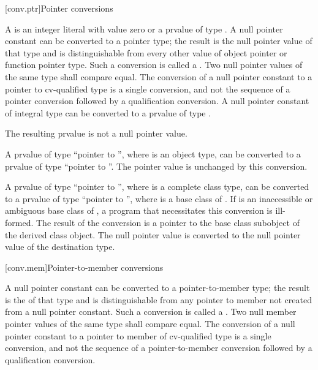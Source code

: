 [conv.ptr]{Pointer conversions}

\pnum
{}%
%
%
%
A  is an integer literal with
value zero
or a prvalue of type . A null pointer constant can be
converted to a pointer type; the
result is the null pointer value of that type and is
distinguishable from every other value of
object pointer or function pointer
type.
Such a conversion is called a .
Two null pointer values of the same type shall compare
equal. The conversion of a null pointer constant to a pointer to
cv-qualified type is a single conversion, and not the sequence of a
pointer conversion followed by a qualification
conversion. A null pointer constant of integral type
can be converted to a prvalue of type .
\begin{note}
The resulting prvalue is not a null pointer value.
\end{note}

\pnum
A prvalue of type ``pointer to \cv{} '', where 
is an object type, can be converted to a prvalue of type ``pointer to
\cv{} ''.
The pointer value is unchanged by this conversion.

\pnum
A prvalue of type ``pointer to \cv{} '', where 
is a complete class type, can be converted to a prvalue of type ``pointer to
\cv{} '', where  is a base class
of . If  is an
inaccessible or
ambiguous base class of , a program
that necessitates this conversion is ill-formed. The result of the
conversion is a pointer to the base class subobject of the derived class
object. The null pointer value is converted to the null pointer value of
the destination type.

[conv.mem]{Pointer-to-member conversions}

\pnum
{}%
%
%
A null pointer constant can be converted to a
pointer-to-member
type; the result is the 
of that type and is distinguishable from any pointer to member not
created from a null pointer constant.
Such a conversion is called a .
Two null member pointer values of
the same type shall compare equal. The conversion of a null pointer
constant to a pointer to member of cv-qualified type is a single
conversion, and not the sequence of a pointer-to-member conversion
followed by a qualification conversion.

